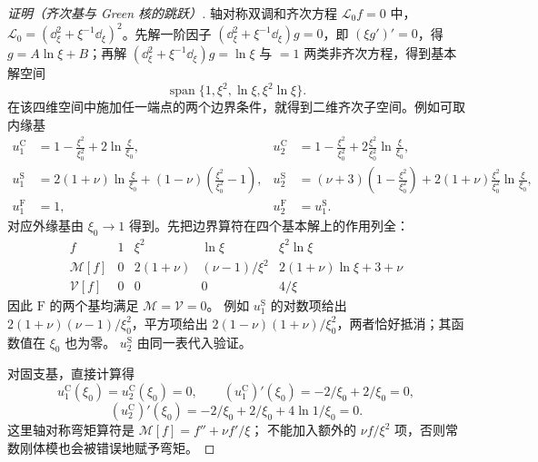 \begin{proof}[证明（齐次基与 Green 核的跳跃）]
轴对称双调和齐次方程 \(\mathcal L_0 f=0\) 中，\(\mathcal L_0=(\dd_\xi^2+\xi^{-1}\dd_\xi)^2\)。先解一阶因子 \((\dd_\xi^2+\xi^{-1}\dd_\xi)g=0\)，即 \((\xi g')'=0\)，得 \(g=A\ln\xi+B\)；再解 \((\dd_\xi^2+\xi^{-1}\dd_\xi)g=\ln\xi\) 与 \(=1\) 两类非齐次方程，得到基本解空间
\[
 \operatorname{span}\{1,\xi^2,\ln\xi,\xi^2\ln\xi\}.
\]
在该四维空间中施加任一端点的两个边界条件，就得到二维齐次子空间。例如可取内缘基
\[
\begin{aligned}
 u_1^{\mathrm C}&=1-\frac{\xi^2}{\xi_0^2}+2\ln\frac{\xi}{\xi_0},&
 u_2^{\mathrm C}&=1-\frac{\xi^2}{\xi_0^2}
 +2\frac{\xi^2}{\xi_0^2}\ln\frac{\xi}{\xi_0},\\
 u_1^{\mathrm S}&=2(1+\nu)\ln\frac{\xi}{\xi_0}
 +(1-\nu)\left(\frac{\xi^2}{\xi_0^2}-1\right),&
 u_2^{\mathrm S}&=(\nu+3)\left(1-\frac{\xi^2}{\xi_0^2}\right)
 +2(1+\nu)\frac{\xi^2}{\xi_0^2}\ln\frac{\xi}{\xi_0},\\
 u_1^{\mathrm F}&=1,&u_2^{\mathrm F}&=u_1^{\mathrm S}.
\end{aligned}
\]
对应外缘基由 $\xi_0\to1$ 得到。先把边界算符在四个基本解上的作用列全：
\[
\begin{array}{c|cccc}
f&1&\xi^2&\ln\xi&\xi^2\ln\xi\\\hline
\mathcal M[f]&0&2(1+\nu)&(\nu-1)/\xi^2&2(1+\nu)\ln\xi+3+\nu\\
\mathcal V[f]&0&0&0&4/\xi
\end{array}
\]
因此 $\mathrm F$ 的两个基均满足 $\mathcal M=\mathcal V=0$。
例如 $u_1^{\mathrm S}$ 的对数项给出
$2(1+\nu)(\nu-1)/\xi_0^2$，平方项给出
$2(1-\nu)(1+\nu)/\xi_0^2$，两者恰好抵消；其函数值在 $\xi_0$ 也为零。
$u_2^{\mathrm S}$ 由同一表代入验证。

对固支基，直接计算得
\[
u_1^{\mathrm C}(\xi_0)=u_2^{\mathrm C}(\xi_0)=0,\qquad
(u_1^{\mathrm C})'(\xi_0)=-2/\xi_0+2/\xi_0=0,
\]
\[
(u_2^{\mathrm C})'(\xi_0)
=-2/\xi_0+2/\xi_0+4\ln1/\xi_0=0.
\]
这里轴对称弯矩算符是 $\mathcal M[f]=f''+\nu f'/\xi$；
不能加入额外的 $\nu f/\xi^2$ 项，否则常数刚体模也会被错误地赋予弯矩。


\end{proof}
